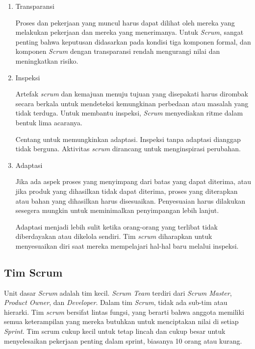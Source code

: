 \begin{enumerate}
	\item Transparansi
	
	Proses dan pekerjaan yang muncul harus dapat dilihat oleh mereka yang melakukan pekerjaan dan mereka yang menerimanya. Untuk \emph{Scrum}, sangat penting bahwa keputusan didasarkan pada kondisi tiga komponen formal, dan komponen \emph{Scrum} dengan transparansi rendah mengurangi nilai dan meningkatkan risiko.
		
	\item Inspeksi
		
	Artefak \emph{scrum} dan kemajuan menuju tujuan yang disepakati harus dirombak secara berkala untuk mendeteksi kemungkinan perbedaan atau masalah yang tidak terduga. Untuk membantu inspeksi, \emph{Scrum} menyediakan ritme dalam bentuk lima acaranya.

	Centang untuk memungkinkan adaptasi. Inspeksi tanpa adaptasi dianggap tidak berguna. Aktivitas \emph{scrum} dirancang untuk menginspirasi perubahan.	
		
	\item Adaptasi
	
	Jika ada aspek proses yang menyimpang dari batas yang dapat diterima, atau jika produk yang dihasilkan tidak dapat diterima, proses yang diterapkan atau bahan yang dihasilkan harus disesuaikan. Penyesuaian harus dilakukan sesegera mungkin untuk meminimalkan penyimpangan lebih lanjut.

	Adaptasi menjadi lebih sulit ketika orang-orang yang terlibat tidak diberdayakan atau dikelola sendiri. Tim \emph{scrum} diharapkan untuk menyesuaikan diri saat mereka mempelajari hal-hal baru melalui inspeksi.

\end{enumerate}

	\subsection{Tim Scrum}
	
	Unit dasar \emph{Scrum} adalah tim kecil. \emph{Scrum Team} terdiri dari \emph{Scrum Master}, \emph{Product Owner}, dan \emph{Developer}. Dalam tim \emph{Scrum}, tidak ada sub-tim atau hierarki. Tim \emph{scrum} bersifat lintas fungsi, yang berarti bahwa anggota memiliki semua keterampilan yang mereka butuhkan untuk menciptakan nilai di setiap \emph{Sprint}. Tim scrum cukup kecil untuk tetap lincah dan cukup besar untuk menyelesaikan pekerjaan penting dalam sprint, biasanya 10 orang atau kurang.

